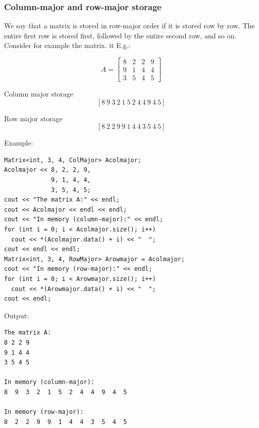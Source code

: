 \documentclass[smaller,a4paper]{beamer}
\begin{document}
\begin{frame}
\frametitle{Column-major and row-major storage}
We say that a matrix is stored in row-major order if it is stored row by row. 
The entire first row is stored first, followed by the entire second row, and so on. Consider for example the matrix. {it E.g.}:

$$
A =
\left[\begin{array}{cccc}
8 & 2 & 2 & 9 \\
9 & 1 & 4 & 4 \\
3 & 5 & 4 & 5
\end{array}\right]
$$

Column major storage
$$ [8\ 9\ 3\ 2\ 1\ 5\ 2\ 4\ 4\ 9\ 4\ 5]$$

Row major storage
$$ [8\ 2\ 2\ 9\ 9\ 1\ 4\ 4\ 3\ 5\ 4\ 5]$$

\newpage

Example:\small
\begin{lstlisting}
Matrix<int, 3, 4, ColMajor> Acolmajor;
Acolmajor << 8, 2, 2, 9,
             9, 1, 4, 4,
             3, 5, 4, 5;
cout << "The matrix A:" << endl;
cout << Acolmajor << endl << endl; 
cout << "In memory (column-major):" << endl;
for (int i = 0; i < Acolmajor.size(); i++)
  cout << *(Acolmajor.data() + i) << "  ";
cout << endl << endl;
Matrix<int, 3, 4, RowMajor> Arowmajor = Acolmajor;
cout << "In memory (row-major):" << endl;
for (int i = 0; i < Arowmajor.size(); i++)
  cout << *(Arowmajor.data() + i) << "  ";
cout << endl;
\end{lstlisting}
\newpage
Output:
\begin{lstlisting}
The matrix A:
8 2 2 9
9 1 4 4
3 5 4 5

In memory (column-major):
8  9  3  2  1  5  2  4  4  9  4  5  

In memory (row-major):
8  2  2  9  9  1  4  4  3  5  4  5
\end{lstlisting}
\end{frame}
\end{document}
